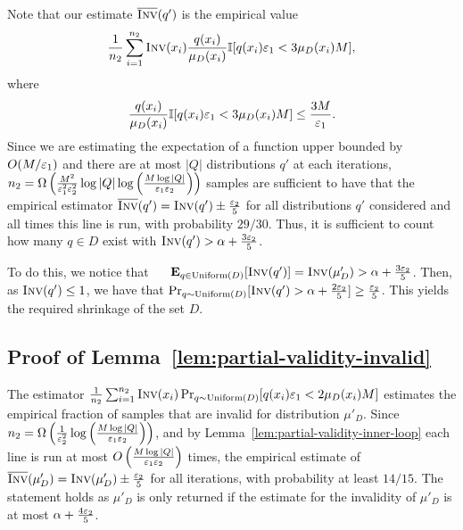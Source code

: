 Note that our estimate $\overline {\textsc{Inv}}(q')$ is the empirical value
$$\frac{1}{n_2} \sum_{i=1}^{n_2} \textsc{Inv}(x_i) \frac {q(x_i)} {\mu_D(x_i)} \mathbb{I}[q(x_i) {\varepsilon_1} < 3 \mu_D(x_i) {M} ],$$
where
$$\frac{q(x_i)}{\mu_D(x_i)} \mathbb{I}[q(x_i) {\varepsilon_1} < 3 \mu_D(x_i) {M} ] \leq \frac{3M}{\varepsilon_1}.$$
Since we are estimating the expectation of a function upper bounded by $O(M/\varepsilon_1)$ and there are at most $|Q|$ distributions $q'$ at each iterations, $n_2 = \Omega\left(\frac {M^2} {\varepsilon_1^2 \varepsilon_2^2} \log |Q| \log \left(\frac{M \log |Q|}{\varepsilon_1 \varepsilon_2}\right)\right)$ samples are sufficient to have that the empirical estimator $\overline {\textsc{Inv}}(q') = \textsc{Inv}(q') \pm \frac {\varepsilon_2}{5}$ for all distributions $q'$ considered and all times this line is run, with probability $29/30$. 
Thus, it is sufficient to count how many $q \in D$ exist with $\textsc{Inv}(q') > \alpha + \frac {3 \varepsilon_2}{5}$.

To do this, we notice that $\Exp_{q \in \Unif(D)} [\Inv(q')] = \Inv(\mu'_D) > \alpha + \frac {3 \eps_2}{5}$. Then, as $\textsc{Inv}(q') \le 1$, we have that $\Pr_{q\sim \text{Uniform}(D)}[\textsc{Inv}(q') > \alpha + \frac {2 \varepsilon_2}{5}] \ge \frac {\varepsilon_2}{5}$. This yields the required shrinkage of the set $D$.


\subsection{Proof of Lemma~\ref{lem:partial-validity-invalid}}
The estimator $\frac{1}{n_2} \sum_{i=1}^{n_2} \textsc{Inv}(x_i) \Pr_{q \sim \text{Uniform}(D)}[q(x_i) {\varepsilon_1} < 2 \mu_D(x_i) {M} ]$ estimates the empirical fraction of samples that are invalid for distribution $\mu'_D$. 
Since $n_2 = \Omega\left( \frac {1} {\varepsilon_2^2} \log \left(\frac{M \log |Q|}{\varepsilon_1 \varepsilon_2}\right) \right)$, and by Lemma~\ref{lem:partial-validity-inner-loop} each line is run at most $O\left(\frac{M \log |Q|}{\varepsilon_1\varepsilon_2}\right)$ times, the empirical estimate of $\overline {\textsc{Inv}}(\mu'_D) = \textsc{Inv}(\mu'_D) \pm \frac {\varepsilon_2} 5$ for all iterations, with probability at least $14/15$.
The statement holds as $\mu'_D$ is only returned if the estimate for the invalidity of $\mu'_D$ is at most $\alpha + \frac {4 \varepsilon_2}{5}$.


